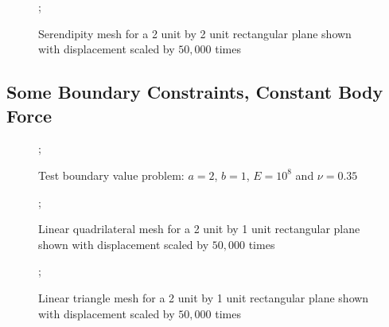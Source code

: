 \documentclass{article}
\begin{document}
\begin{figure}
    ;
    \caption{Serendipity mesh for a 2 unit by 2 unit rectangular plane shown with displacement scaled by $50,000$ times}
\centering
\end{figure}

\FloatBarrier
\subsection{Some Boundary Constraints, Constant Body Force}
\FloatBarrier

\begin{figure}
    ;
    \caption{Test boundary value problem: $a = 2$, $b = 1$, $E = 10^8$ and $\nu = 0.35$}
\centering
\end{figure}

\begin{figure}
    ;
    \caption{Linear quadrilateral mesh for a 2 unit by 1 unit rectangular plane shown with displacement scaled by $50,000$ times}
\centering
\end{figure}

\begin{figure}
    ;
    \caption{Linear triangle mesh for a 2 unit by 1 unit rectangular plane shown with displacement scaled by $50,000$ times}
\centering
\end{figure}
\end{document}
